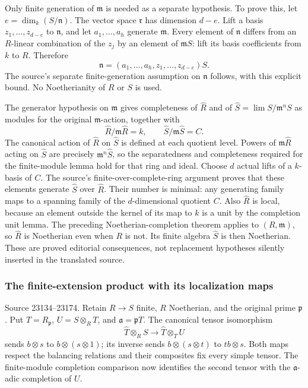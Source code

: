 Only finite generation of \(\mathfrak m\) is needed as a separate hypothesis. To prove this, let \(e=\dim_k(S/\mathfrak n)\). The vector space \(\mathfrak r\) has dimension \(d-e\). Lift a basis \(z_1,\ldots,z_{d-e}\) to \(\mathfrak n\), and let \(a_1,\ldots,a_h\) generate \(\mathfrak m\). Every element of \(\mathfrak n\) differs from an \(R\)-linear combination of the \(z_j\) by an element of \(\mathfrak mS\): lift its basis coefficients from \(k\) to \(R\). Therefore \[
\mathfrak n=(a_1,\ldots,a_h,z_1,\ldots,z_{d-e})S .
\] The source's separate finite-generation assumption on \(\mathfrak n\) follows, with this explicit bound. No Noetherianity of \(R\) or \(S\) is used.

The generator hypothesis on \(\mathfrak m\) gives completeness of \(\widehat R\) and of \(\widehat S=\lim S/\mathfrak m^nS\) as modules for the original \(\mathfrak m\)-action, together with \[
\widehat R/\mathfrak m\widehat R=k,\qquad
\widehat S/\mathfrak m\widehat S=C.
\] The canonical action of \(\widehat R\) on \(\widehat S\) is defined at each quotient level. Powers of \(\mathfrak m\widehat R\) acting on \(\widehat S\) are precisely \(\mathfrak m^n\widehat S\), so the separatedness and completeness required for the finite-module lemma hold for that ring and ideal. Choose \(d\) actual lifts of a \(k\)-basis of \(C\). The source's finite-over-complete-ring argument proves that these elements generate \(\widehat S\) over \(\widehat R\). Their number is minimal: any generating family maps to a spanning family of the \(d\)-dimensional quotient \(C\). Also \(\widehat R\) is local, because an element outside the kernel of its map to \(k\) is a unit by the completion unit lemma. The preceding Noetherian-completion theorem applies to \((R,\mathfrak m)\), so \(\widehat R\) is Noetherian even when \(R\) is not. Its finite algebra \(\widehat S\) is then Noetherian. These are proved editorial consequences, not replacement hypotheses silently inserted in the translated source.

\subsubsection{The finite-extension product with its localization maps}\label{the-finite-extension-product-with-its-localization-maps}

Source 23134--23174. Retain \(R\to S\) finite, \(R\) Noetherian, and the original prime \(\mathfrak p\). Put \(T=R_{\mathfrak p}\), \(U=S\otimes_R T\), and \(\mathfrak a=\mathfrak pT\). The canonical tensor isomorphism \[
\widehat T\otimes_R S
 \longrightarrow\widehat T\otimes_T U
\] sends \(b\otimes s\) to \(b\otimes(s\otimes1)\); its inverse sends \(b\otimes(s\otimes t)\) to \(tb\otimes s\). Both maps respect the balancing relations and their composites fix every simple tensor. The finite-module completion comparison now identifies the second tensor with the \(\mathfrak a\)-adic completion of \(U\).

